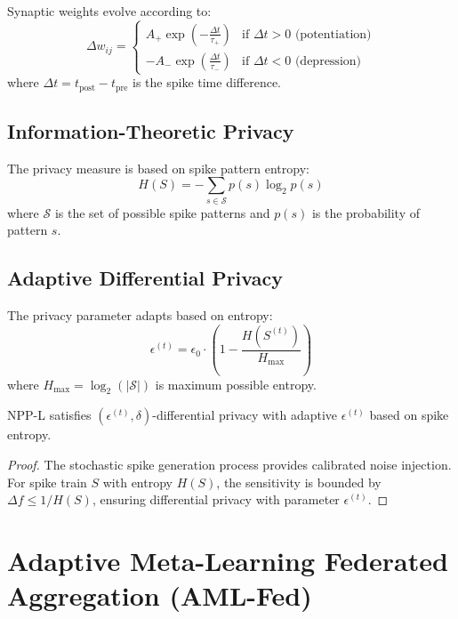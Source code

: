\documentclass[12pt,a4paper]{article}
\begin{document}
Synaptic weights evolve according to:
\begin{equation}
\Delta w_{ij} = \begin{cases}
A_+ \exp\left(-\frac{\Delta t}{\tau_+}\right) & \text{if } \Delta t > 0 \text{ (potentiation)} \\
-A_- \exp\left(\frac{\Delta t}{\tau_-}\right) & \text{if } \Delta t < 0 \text{ (depression)}
\end{cases}
\end{equation}
where $\Delta t = t_{\text{post}} - t_{\text{pre}}$ is the spike time difference.

\subsection{Information-Theoretic Privacy}

The privacy measure is based on spike pattern entropy:
\begin{equation}
H(S) = -\sum_{s \in \mathcal{S}} p(s) \log_2 p(s)
\end{equation}
where $\mathcal{S}$ is the set of possible spike patterns and $p(s)$ is the probability of pattern $s$.

\subsection{Adaptive Differential Privacy}

The privacy parameter adapts based on entropy:
\begin{equation}
\epsilon^{(t)} = \epsilon_0 \cdot \left(1 - \frac{H(S^{(t)})}{H_{\max}}\right)
\end{equation}
where $H_{\max} = \log_2(|\mathcal{S}|)$ is maximum possible entropy.

\begin{theorem}
NPP-L satisfies $(\epsilon^{(t)}, \delta)$-differential privacy with adaptive $\epsilon^{(t)}$ based on spike entropy.
\end{theorem}

\begin{proof}
The stochastic spike generation process provides calibrated noise injection. For spike train $S$ with entropy $H(S)$, the sensitivity is bounded by $\Delta f \leq 1/H(S)$, ensuring differential privacy with parameter $\epsilon^{(t)}$.
\end{proof}

\section{Adaptive Meta-Learning Federated Aggregation (AML-Fed)}
\end{document}
